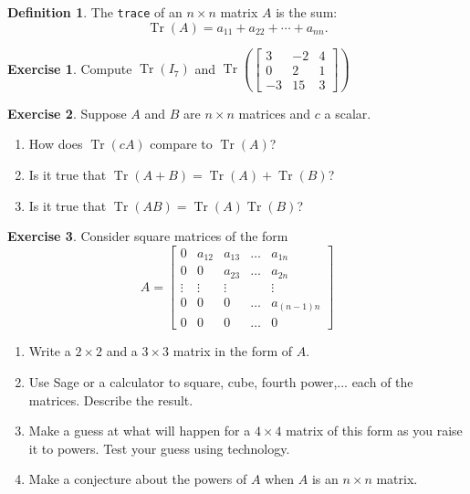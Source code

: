 \documentclass[handout]{beamer}
\newcommand{\fn}{\insertframenumber}
\theoremstyle{definition}
\newtheorem{exercise}{Exercise}
\newtheorem*{defn}{Definition}
\renewcommand{\emph}[1]{{\color{blue}\texttt{#1}}}
\begin{document}
\begin{frame}{\fn}
	\begin{defn}
		The \emph{trace} of an $n\times n$ matrix $A$ is the sum:	\[\operatorname{Tr}(A)=a_{11}+a_{22}+\cdots+a_{nn}.\]
	\end{defn}
	\begin{exercise}
		Compute $\operatorname{Tr}(I_7)$ and  $\operatorname{Tr}\left(\begin{bmatrix}
		3&-2&4\\0&2&1\\-3&15&3\end{bmatrix}\right)$
	\end{exercise}

	\begin{exercise}
		Suppose $A$ and $B$ are $n\times n$ matrices and $c$ a scalar.
		\begin{enumerate}[label=(\alph*)]
			\item How does $\operatorname{Tr}(cA)$ compare to $\operatorname{Tr}(A)$?
			\item Is it true that $\operatorname{Tr}(A+B)=\operatorname{Tr}(A)+\operatorname{Tr}(B)$?
			\item Is it true that $\operatorname{Tr}(AB)=\operatorname{Tr}(A)\operatorname{Tr}(B)$?
		\end{enumerate}
	\end{exercise}
\end{frame}

\begin{frame}{\fn}
\begin{exercise}
	Consider square matrices of the form
	\[A=\begin{bmatrix}
	0&a_{12}&a_{13}&\dots&a_{1n}\\
	0&0&a_{23}&\dots &a_{2n}\\
	\vdots&\vdots&\vdots&&\vdots\\
	0&0&0&\dots &a_{(n-1)n}\\
	0&0&0&\dots&0
	\end{bmatrix}\]
	\begin{enumerate}[label=(\alph*)]
		\item Write a $2\times 2$ and a $3\times 3$ matrix in the form of $A$.
		\item Use Sage or a calculator to square, cube, fourth power,... each of the matrices. Describe the result.
		\item Make a guess at what will happen for a $4\times 4$ matrix of this form as you raise it to powers.  Test your guess using technology.
		\item Make a conjecture about the powers of $A$ when $A$ is an $n\times n$ matrix.
	\end{enumerate}
\end{exercise}
\end{frame}
\end{document}
